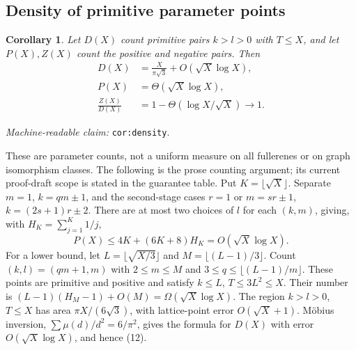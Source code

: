 \documentclass[11pt]{amsart}
\newcommand{\record}[1]{\nolinkurl{#1}}
\newtheorem{corollary}[theorem]{Corollary}
\newcommand{\claimid}[1]{\par\nopagebreak\noindent\textit{Machine-readable claim:} \record{#1}.\par}
\begin{document}
\subsection{Density of primitive parameter points}
\begin{samepage}\begin{corollary}\label{cor:density}
Let $D(X)$ count primitive pairs $k>l>0$ with $T\le X$, and let
$P(X),Z(X)$ count the positive and negative pairs. Then
\begin{equation}\label{eq:12}
\begin{aligned}
D(X)&=\frac{X}{\pi\sqrt3}+O(\sqrt X\log X),\\
P(X)&=\Theta(\sqrt X\log X),\\
\frac{Z(X)}{D(X)}&=1-\Theta(\log X/\sqrt X)\longrightarrow1.
\end{aligned}\tag{12}
\end{equation}
\end{corollary}
\claimid{cor:density}\end{samepage}
These are parameter counts, not a uniform measure on all fullerenes
or on graph isomorphism classes. The following is the prose counting
argument; its current proof-draft scope is stated in the guarantee table.
Put $K=\lfloor\sqrt X\rfloor$. Separate $m=1$, $k=qm\pm1$,
and the second-stage cases $r=1$ or $m=sr\pm1$,
$k=(2s+1)r\pm2$. There are at most two choices of $l$ for each
$(k,m)$, giving, with $H_K=\sum_{j=1}^K1/j$,
\[
 P(X)\le4K+(6K+8)H_K=O(\sqrt X\log X).
\]
For a lower bound, let $L=\lfloor\sqrt{X/3}\rfloor$ and
$M=\lfloor(L-1)/3\rfloor$. Count $(k,l)=(qm+1,m)$ with
$2\le m\le M$ and $3\le q\le\lfloor(L-1)/m\rfloor$.
These points are primitive and positive and satisfy $k\le L$,
$T\le3L^2\le X$. Their number is
$(L-1)(H_M-1)+O(M)=\Omega(\sqrt X\log X)$.
The region $k>l>0$, $T\le X$ has area $\pi X/(6\sqrt3)$,
with lattice-point error $O(\sqrt X+1)$. M\"obius inversion,
$\sum\mu(d)/d^2=6/\pi^2$, gives the formula for $D(X)$ with
error $O(\sqrt X\log X)$, and hence (12).
\end{document}
